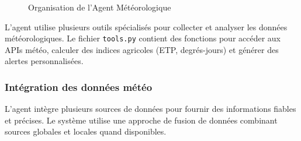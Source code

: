 \begin{figure}[h]
\centering
{}
\caption{Organisation de l'Agent Météorologique}
\end{figure}

L'agent utilise plusieurs outils spécialisés pour collecter et analyser les données météorologiques. Le fichier \texttt{tools.py} contient des fonctions pour accéder aux APIs météo, calculer des indices agricoles (ETP, degrés-jours) et générer des alertes personnalisées.

\subsubsection{Intégration des données météo}

L'agent intègre plusieurs sources de données pour fournir des informations fiables et précises. Le système utilise une approche de fusion de données combinant sources globales et locales quand disponibles.

